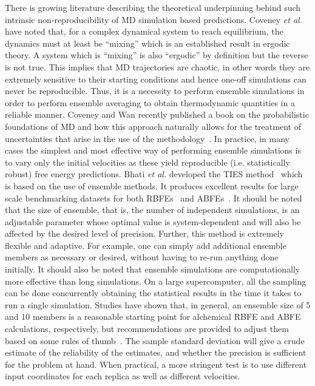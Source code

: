 \documentclass[9pt,bestpractices]{livecoms}
\begin{document}
There is growing literature describing the theoretical underpinning behind such intrinsic non-reproducibility of MD simulation based predictions. Coveney \textit{et al. }~\cite{coveney2016} have noted that, for a complex dynamical system to reach equilibrium, the dynamics must at least be ``mixing'' which is an established result in ergodic theory. A system which is ``mixing'' is also ``ergodic'' by definition but the reverse is not true. This implies that MD trajectories are chaotic, in other words they are extremely sensitive to their starting conditions and hence one-off simulations can never be reproducible. Thus, it is a necessity to perform ensemble simulations in order to perform ensemble averaging to obtain thermodynamic quantities in a reliable manner. Coveney and Wan recently published a book on the probabilistic foundations of MD and how this approach naturally allows for the treatment of uncertainties that arise in the use of the methodology~\cite{MDbook2025}. In practice, in many cases the simplest and most effective way of performing ensemble simulations is to vary only the initial velocities as these yield reproducible (i.e. statistically robust) free energy predictions. Bhati \textit{et al.} developed the TIES method~\cite{bhati2017} which is based on the use of ensemble methods. It produces excellent results for large scale benchmarking datasets for both RBFEs~\cite{bhati2022} and ABFEs~\cite{bhati2025}. It should be noted that the size of ensemble, that is, the number of independent simulations, is an adjustable parameter whose optimal value is system-dependent and will also be affected by the desired level of precision. Further, this method is extremely flexible and adaptive. For example, one can simply add additional ensemble members as necessary or desired, without having to re-run anything done initially. It should also be noted that ensemble simulations are computationally more effective than long simulations. On a large supercomputer, all the sampling can be done concurrently obtaining the statistical results in the time it takes to run a single simulation. Studies have shown that, in general, an ensemble size of 5 and 10 members is a reasonable starting point for alchemical RBFE and ABFE calculations, respectively, but recommendations are provided to adjust them based on some rules of thumb~\cite{bhati2022, bhati2025}. 
The sample standard deviation will give a crude estimate of the reliability of the estimates, and whether the precision is sufficient for the problem at hand. When practical, a more stringent test is to use different input coordinates for each replica as well as different velocities. 
\end{document}
